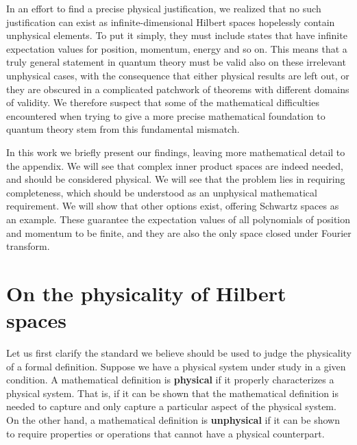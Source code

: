 \documentclass[10pt,twocolumn, nofootinbib]{revtex4-2}
\begin{document}
In an effort to find a precise physical justification, we realized that no such justification can exist as infinite-dimensional Hilbert spaces hopelessly contain unphysical elements. To put it simply, they must include states that have infinite expectation values for position, momentum, energy and so on. This means that a truly general statement in quantum theory must be valid also on these irrelevant unphysical cases, with the consequence that either physical results are left out, or they are obscured in a complicated patchwork of theorems with different domains of validity. We therefore suspect that some of the mathematical difficulties encountered when trying to give a more precise mathematical foundation to quantum theory stem from this fundamental mismatch.

In this work we briefly present our findings, leaving more mathematical detail to the appendix. We will see that complex inner product spaces are indeed needed, and should be considered physical. We will see that the problem lies in requiring completeness, which should be understood as an unphysical mathematical requirement. We will show that other options exist, offering Schwartz spaces as an example. These guarantee the expectation values of all polynomials of position and momentum to be finite, and they are also the only space closed under Fourier transform.

\section{On the physicality of Hilbert spaces}

Let us first clarify the standard we believe should be used to judge the physicality of a formal definition.\cite{redei_tension_2020, north_physics_2021} Suppose we have a physical system under study in a given condition. A mathematical definition is \textbf{physical} if it properly characterizes a physical system. That is, if it can be shown that the mathematical definition is needed to capture and only capture a particular aspect of the physical system. On the other hand, a mathematical definition is \textbf{unphysical} if it can be shown to require properties or operations that cannot have a physical counterpart.
\end{document}
